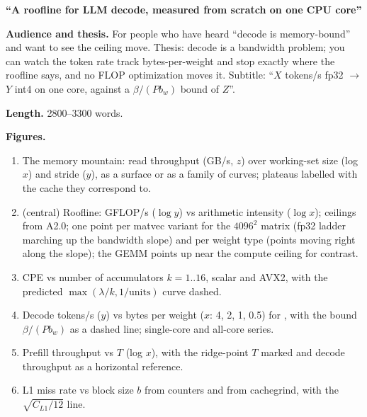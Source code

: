 \begin{blogbox}
 \textbf{``A roofline for LLM decode, measured from scratch on one CPU core''}

\textbf{Audience and thesis.} For people who have heard ``decode is memory-bound'' and want to see the ceiling move. Thesis: decode is a bandwidth problem; you can watch the token rate track bytes-per-weight and stop exactly where the roofline says, and no FLOP optimization moves it. Subtitle: ``$X$ tokens/s fp32 $\to$ $Y$ int4 on one core, against a $\beta/(Pb_w)$ bound of $Z$''.

\textbf{Length.} 2800--3300 words.

\textbf{Figures.}
\begin{enumerate}
  \item {} The memory mountain: read throughput (GB/s, $z$) over working-set size (log $x$) and stride ($y$), as a surface or as a family of curves; plateaus labelled with the cache they correspond to.
  \item {} (central) Roofline: GFLOP/s ($\log y$) vs arithmetic intensity ($\log x$); ceilings from A2.0; one point per matvec variant for the $4096^2$ matrix (fp32 ladder marching up the bandwidth slope) and per weight type (points moving right along the slope); the GEMM points up near the compute ceiling for contrast.
  \item {} CPE vs number of accumulators $k=1..16$, scalar and AVX2, with the predicted $\max(\lambda/k, 1/\text{units})$ curve dashed.
  \item {} Decode tokens/s ($y$) vs bytes per weight ($x$: 4, 2, 1, 0.5) for , with the bound $\beta/(Pb_w)$ as a dashed line; single-core and all-core series.
  \item {} Prefill throughput vs $T$ (log $x$), with the ridge-point $T$ marked and decode throughput as a horizontal reference.
  \item {} L1 miss rate vs block size $b$ from counters and from cachegrind, with the $\sqrt{C_{L1}/12}$ line.
\end{enumerate}


\end{blogbox}
